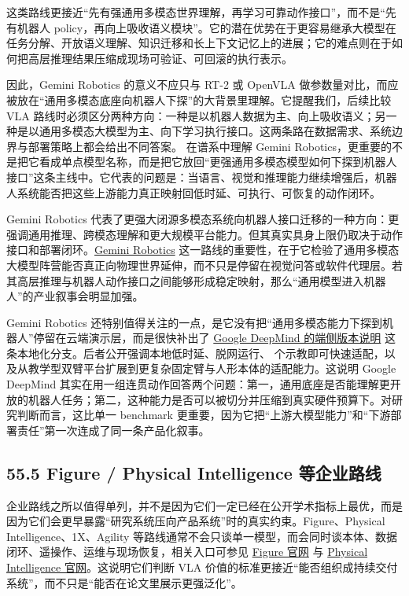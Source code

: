 这类路线更接近“先有强通用多模态世界理解，再学习可靠动作接口”，而不是“先有机器人 policy，再向上吸收语义模块”。它的潜在优势在于更容易继承大模型在任务分解、开放语义理解、知识迁移和长上下文记忆上的进展；它的难点则在于如何把高层推理结果压缩成现场可验证、可回滚的执行表示。

因此，Gemini Robotics 的意义不应只与 RT-2 或 OpenVLA 做参数量对比，而应被放在“通用多模态底座向机器人下探”的大背景里理解。它提醒我们，后续比较 VLA 路线时必须区分两种方向：一种是以机器人数据为主、向上吸收语义；另一种是以通用多模态大模型为主、向下学习执行接口。这两条路在数据需求、系统边界与部署策略上都会给出不同答案。 在谱系中理解 Gemini Robotics，更重要的不是把它看成单点模型名称，而是把它放回“更强通用多模态模型如何下探到机器人接口”这条主线中。它代表的问题是：当语言、视觉和推理能力继续增强后，机器人系统能否把这些上游能力真正映射回低时延、可执行、可恢复的动作闭环。

Gemini Robotics 代表了更强大闭源多模态系统向机器人接口迁移的一种方向：更强调通用推理、跨模态理解和更大规模平台能力。但其真实具身上限仍取决于动作接口和部署闭环。\href{https://deepmind.google/blog/gemini-robotics-brings-ai-into-the-physical-world/}{Gemini Robotics} 这一路线的重要性，在于它检验了通用多模态大模型阵营能否真正向物理世界延伸，而不只是停留在视觉问答或软件代理层。若其高层推理与机器人动作接口之间能够形成稳定映射，那么“通用模型进入机器人”的产业叙事会明显加强。

Gemini Robotics 还特别值得关注的一点，是它没有把“通用多模态能力下探到机器人”停留在云端演示层，而是很快补出了 \href{https://deepmind.google/blog/gemini-robotics-on-device-brings-ai-to-local-robotic-devices/}{Google DeepMind 的端侧版本说明} 这条本地化分支。后者公开强调本地低时延、脱网运行、\texttt{} 个示教即可快速适配，以及从教学型双臂平台扩展到更复杂固定臂与人形本体的适配能力。这说明 Google DeepMind 其实在用一组连贯动作回答两个问题：第一，通用底座是否能理解更开放的机器人任务；第二，这种能力是否可以被切分并压缩到真实硬件预算下。对研究判断而言，这比单一 benchmark 更重要，因为它把“上游大模型能力”和“下游部署责任”第一次连成了同一条产品化叙事。

\subsection*{55.5 Figure / Physical Intelligence 等企业路线}


企业路线之所以值得单列，并不是因为它们一定已经在公开学术指标上最优，而是因为它们会更早暴露“研究系统压向产品系统”时的真实约束。Figure、Physical Intelligence、1X、Agility 等路线通常不会只谈单一模型，而会同时谈本体、数据闭环、遥操作、运维与现场恢复，相关入口可参见 \href{https://www.figure.ai/}{Figure 官网} 与 \href{https://www.physicalintelligence.company/}{Physical Intelligence 官网}。这说明它们判断 VLA 价值的标准更接近“能否组织成持续交付系统”，而不只是“能否在论文里展示更强泛化”。

